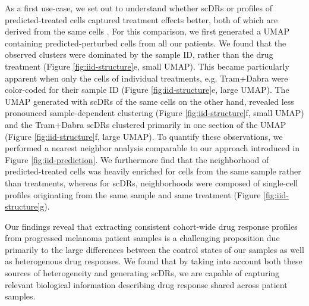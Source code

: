 As a first use-case, we set out to understand whether scDRs or profiles of predicted-treated cells captured treatment effects better, both of which are derived from the same cells .
 For this comparison, we first generated a UMAP containing predicted-perturbed cells from all our patients.
 We found that the observed clusters were dominated by the sample ID, rather than the drug treatment (Figure \ref{fig:iid-structure}e, small UMAP).
 This became particularly apparent when only the cells of individual treatments, e.g. Tram+Dabra were color-coded for their sample ID (Figure \ref{fig:iid-structure}e, large UMAP).
 The UMAP generated with scDRs of the same cells on the other hand, revealed less pronounced sample-dependent clustering (Figure \ref{fig:iid-structure}f, small UMAP) and the Tram+Dabra scDRs clustered primarily in one section of the UMAP (Figure \ref{fig:iid-structure}f, large UMAP).
 To quantify these observations, we performed a nearest neighbor analysis comparable to our approach introduced in Figure \ref{fig:iid-prediction}.
We furthermore find that the neighborhood of predicted-treated cells was heavily enriched for cells from the same sample rather than treatments, whereas for scDRs, neighborhoods were composed of single-cell profiles originating from the same sample and same treatment (Figure \ref{fig:iid-structure}g).

Our findings reveal that extracting consistent cohort-wide drug response profiles from progressed melanoma patient samples is a challenging proposition due primarily to the large differences between the control states of our samples as well as heterogenous drug responses.
 We found that by taking into account both these sources of heterogeneity and generating scDRs, we are capable of capturing relevant biological information describing drug response shared across patient samples. 

